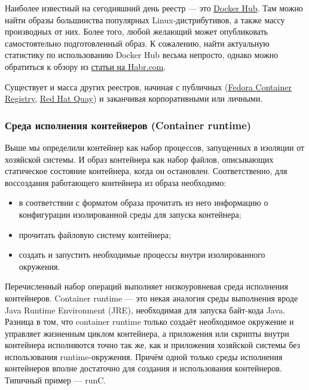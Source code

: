 \documentclass[14pt, a4paper]{article}
\begin{document}
Наиболее известный на сегодняшний день реестр — это \href{https://hub.docker.com/}{Docker Hub}. Там можно найти образы
большинства популярных Linux-дистрибутивов, а также массу производных от них. Более того, любой
желающий может опубликовать самостоятельно подготовленный образ. К сожалению, найти
актуальную статистику по использованию Docker Hub весьма непросто, однако можно обратиться к
обзору из \href{https://habr.com/ru/company/flant/blog/337448/}{статьи на Habr.com}.

Существует и масса других реестров, начиная с публичных (\href{https://registry.fedoraproject.org/}{Fedora Container Registry}, \href{https://quay.io/}{Red Hat Quay}) и
заканчивая корпоративными или личными.\\


\subsubsection*{Среда исполнения контейнеров (Container runtime)}

Выше мы определили контейнер как набор процессов, запущенных в изоляции от хозяйской системы.
И образ контейнера как набор файлов, описывающих статическое состояние контейнера, когда он
остановлен. Соответственно, для воссоздания работающего контейнера из образа необходимо:

\begin{itemize}
    \item в соответствии с форматом образа прочитать из него информацию о конфигурации
    изолированной среды для запуска контейнера;
    \item прочитать файловую систему контейнера;
    \item создать и запустить необходимые процессы внутри изолированного окружения.
\end{itemize}

Перечисленный набор операций выполняет низкоуровневая среда исполнения контейнеров. Container
runtime — это некая аналогия среды выполнения вроде Java Runtime Environment (JRE), необходимая
для запуска байт-кода Java. Разница в том, что container runtime только создаёт необходимое
окружение и управляет жизненным циклом контейнера, а приложения или скрипты внутри контейнера
исполняются точно так же, как и приложения хозяйской системы без использования
runtime-окружения. Причём одной только среды исполнения контейнеров вполне достаточно для
создания и использования контейнеров. Типичный пример — runC.
\end{document}
